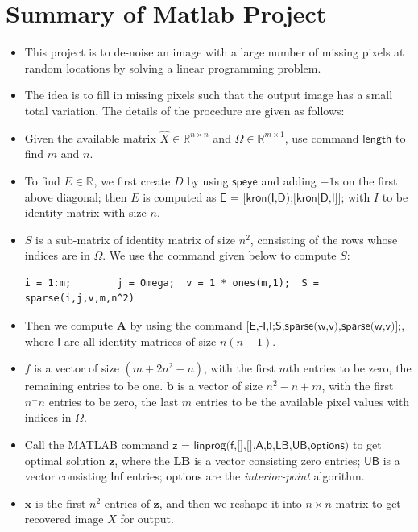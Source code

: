 \documentclass[11pt]{article}
\begin{document}
\clearpage
\section*{Summary of Matlab Project}
\begin{itemize}
\item
This project is to de-noise an image with a large number of missing pixels at random locations by solving a linear programming problem.
\item
The idea is to fill in missing pixels such that the output image has a small total variation. The details of the procedure are given as follows:
\item
Given the available matrix $\hat X\in\mathbb{R}^{n\times n}$ and $\Omega\in\mathbb{R}^{m\times 1}$, use command $\textsf{length}$ to find $m$ and $n$.
\item
To find $E\in\mathbb{R}^{}$, we first create $D$ by using $\textsf{speye}$ and adding $-1$s on the first above diagonal; then $E$ is computed as $\textsf{E = [kron(I,D);[kron[D,I]];}$ with $I$ to be identity matrix with size $n$.
\item
$S$ is a sub-matrix of identity matrix of size $n^2$, consisting of the rows whose indices are in $\Omega$. We use the command given below to compute $S$:
\begin{verbatim}
i = 1:m;		j = Omega;	v = 1 * ones(m,1);  S = sparse(i,j,v,m,n^2)
\end{verbatim}
\item
Then we compute $\bm A$ by using the command $\textsf{[E,-I,I;S,sparse(w,v),sparse(w,v)];}$, where $\textsf{I}$ are all identity matrices of size $n(n-1)$.
\item
$f$ is a vector of size $(m+2n^2-n)$, with the first $m$th entries to be zero, the remaining entries to be one. $\bm b$ is a vector of size $n^2-n+m$, with the first $n^-n$ entries to be zero, the last $m$ entries to be the available pixel values with indices in $\Omega$.
\item
Call the MATLAB command $\textsf{z = linprog(f,[],[],A,b,LB,UB,options)}$ to get optimal solution $\bm z$, where the $\textbf{LB}$ is a vector consisting zero entries; $\textsf{UB}$ is a vector consisting $\textsf{Inf}$ entries; options are the \textit{interior-point} algorithm.
\item
$\bm x$ is the first $n^2$ entries of $\bm z$, and then we reshape it into $n\times n$ matrix to get recovered image $X$ for output.

\end{itemize}
\clearpage
\end{document}
